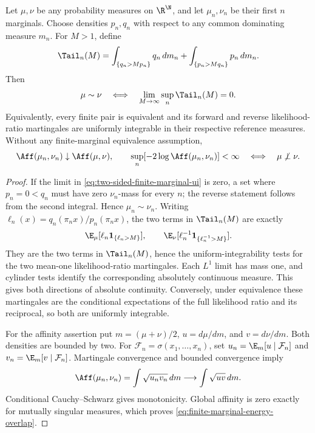 \begin{proposition}
\label{prop:two-sided-finite-marginal-ratio-tails}
Let \(\mu,\nu\) be any probability measures on \(\R^\N\), and let
\(\mu_n,\nu_n\) be their first \(n\) marginals.
Choose densities \(p_n,q_n\) with respect to any common dominating
measure \(m_n\).
For \(M>1\), define
\[
 \Tail_n(M)=
 \int_{\{q_n>Mp_n\}}q_n\,dm_n+
 \int_{\{p_n>Mq_n\}}p_n\,dm_n.
\]
Then
\begin{equation}
 \mu\sim\nu
 \quad\Longleftrightarrow\quad
 \lim_{M\to\infty}\sup_n\Tail_n(M)=0.
 \label{eq:two-sided-finite-marginal-ui}
\end{equation}
Equivalently, every finite pair is equivalent and its forward and
reverse likelihood-ratio martingales are uniformly integrable in their
respective reference measures.
Without any finite-marginal equivalence assumption,
\begin{equation}
 \Aff(\mu_n,\nu_n)\downarrow\Aff(\mu,\nu),\qquad
 \sup_n[-2\log\Aff(\mu_n,\nu_n)]<\infty
     \quad\Longleftrightarrow\quad \mu\not\perp\nu.
 \label{eq:finite-marginal-energy-overlap}
\end{equation}
\end{proposition}
\begin{proof}
If the limit in \eqref{eq:two-sided-finite-marginal-ui} is zero, a set
where \(p_n=0<q_n\) must have zero \(\nu_n\)-mass for every \(n\);
the reverse statement follows from the second integral.
Hence \(\mu_n\sim\nu_n\).
Writing \(\ell_n(x)=q_n(\pi_n x)/p_n(\pi_n x)\), the two terms in
\(\Tail_n(M)\) are exactly
\[
 \E_\mu[\ell_n\mathbf1_{\{\ell_n>M\}}],
 \qquad
 \E_\nu[\ell_n^{-1}\mathbf1_{\{\ell_n^{-1}>M\}}].
\]
They are the two terms in \(\Tail_n(M)\), hence the
uniform-integrability tests for the two mean-one
likelihood-ratio martingales.
Each \(L^1\) limit has mass one, and cylinder tests identify the
corresponding absolutely continuous measure.
This gives both directions of absolute continuity.
Conversely, under equivalence these martingales are the conditional
expectations of the full likelihood ratio and its reciprocal, so both
are uniformly integrable.

For the affinity assertion put \(m=(\mu+\nu)/2\),
\(u=d\mu/dm\), and \(v=d\nu/dm\).
Both densities are bounded by two.
For \(\mathcal F_n=\sigma(x_1,\ldots,x_n)\), set
\(u_n=\E_m[u\mid\mathcal F_n]\) and
\(v_n=\E_m[v\mid\mathcal F_n]\).
Martingale convergence and bounded convergence imply
\[
 \Aff(\mu_n,\nu_n)
       =\int\sqrt{u_nv_n}\,dm
       \longrightarrow\int\sqrt{uv}\,dm.
\]
Conditional Cauchy--Schwarz gives monotonicity.
Global affinity is zero exactly for mutually singular measures,
which proves \eqref{eq:finite-marginal-energy-overlap}.
\end{proof}

